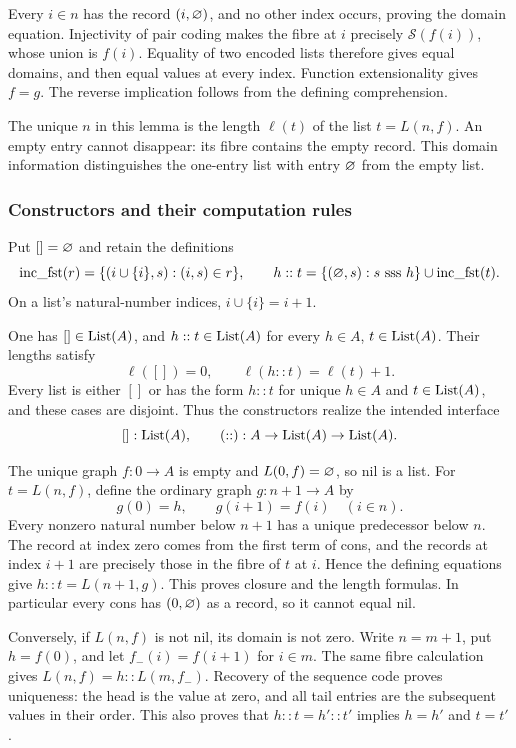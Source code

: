 Every $i\in n$ has the record $(i,\varnothing)$, and no other index
occurs, proving the domain equation. Injectivity of pair coding makes
the fibre at $i$ precisely $\mathcal S(f(i))$, whose union is $f(i)$.
Equality of two encoded lists therefore gives equal domains, and then
equal values at every index. Function extensionality gives $f=g$.
The reverse implication follows from the defining comprehension.
\Done

The unique $n$ in this lemma is the length $\ell(t)$ of the list
$t=L(n,f)$. An empty entry cannot disappear: its fibre contains the
empty record. This domain information distinguishes the one-entry list
with entry $\varnothing$ from the empty list.

\subsubsection{Constructors and their computation rules}
\begin{definition}
Put $[]=\varnothing$ and retain the definitions
\[
\mathrm{inc\_fst}(r)
 =\{(i\cup\{i\},s):(i,s)\in r\},
\qquad
h::t=\{(\varnothing,s):s\mathrm{\ sss\ } h\}\cup\mathrm{inc\_fst}(t).
\]
On a list's natural-number indices, $i\cup\{i\}=i+1$.
\end{definition}

\begin{theorem}
One has $[]\in\mathrm{List}(A)$, and $h::t\in\mathrm{List}(A)$ for every
$h\in A$, $t\in\mathrm{List}(A)$. Their lengths satisfy
\[
\ell([])=0,\qquad \ell(h::t)=\ell(t)+1.
\]
Every list is either $[]$ or has the form $h::t$ for unique
$h\in A$ and $t\in\mathrm{List}(A)$, and these cases are disjoint.
Thus the constructors realize the intended interface
\[
[]:\mathrm{List}(A),\qquad (::):A\to\mathrm{List}(A)\to\mathrm{List}(A).
\]
\end{theorem}
\Proof
The unique graph $f:0\to A$ is empty and $L(0,f)=\varnothing$,
so nil is a list. For $t=L(n,f)$, define the ordinary graph
$g:n+1\to A$ by
\[
g(0)=h,\qquad g(i+1)=f(i)\quad(i\in n).
\]
Every nonzero natural number below $n+1$ has a unique predecessor
below $n$. The record at index zero comes from the first term of cons,
and the records at index $i+1$ are precisely those in the fibre of
$t$ at $i$. Hence the defining equations give $h::t=L(n+1,g)$.
This proves closure and the length formulas. In particular every cons
has $(0,\varnothing)$ as a record, so it cannot equal nil.

Conversely, if $L(n,f)$ is not nil, its domain is not zero. Write
$n=m+1$, put $h=f(0)$, and let $f_-(i)=f(i+1)$ for $i\in m$.
The same fibre calculation gives
$L(n,f)=h::L(m,f_-)$. Recovery of the sequence code proves uniqueness:
the head is the value at zero, and all tail entries are the subsequent
values in their order. This also proves that $h::t=h'::t'$ implies
$h=h'$ and $t=t'$.
\Done

